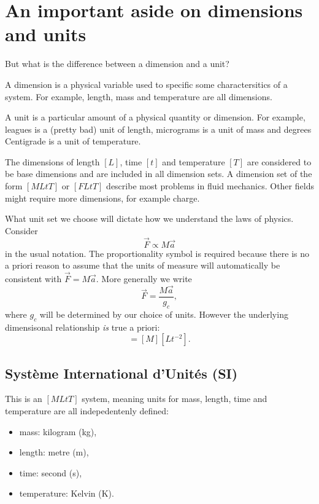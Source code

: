 \section{An important aside on dimensions and units}

But what is the difference between a dimension and a unit?

\begin{definition}
  A dimension is a physical variable used to specific some charactersitics of a system. For example, length, mass and temperature are all dimensions.
\end{definition}

\begin{definition}
  A unit is a particular amount of a physical quantity or dimension. For example, leagues is a (pretty bad) unit of length, micrograms is a unit of mass and degrees Centigrade is a unit of temperature.
\end{definition}

The dimensions of length $[L]$, time $[t]$ and temperature $[T]$ are considered to be base dimensions and are included in all dimension sets. A dimension set of the form $[MLtT]$ or $[FLtT]$ describe most problems in fluid mechanics. Other fields might require more dimensions, for example charge.

What unit set we choose will dictate how we understand the laws of physics. Consider
\begin{equation}
  \vec{F} \propto M \vec{a}
\end{equation}
in the usual notation. The proportionality symbol is required because there is no a priori reason to assume that the units of measure will automatically be consistent with $\vec{F} = M \vec{a}$. More generally we write
\begin{equation}
  \vec{F} = \frac{M \vec{a}}{g_c},
\end{equation}
where $g_c$ will be determined by our choice of units. However the underlying dimensisonal relationship \textit{is} true a priori:
\begin{equation}
  [F] = [M][Lt^{-2}].
\end{equation}

\subsection*{Système International d'Unités (SI)}

This is an $[MLtT]$ system, meaning units for mass, length, time and temperature are all indepedentenly defined:
\begin{itemize}
  \item mass: kilogram (kg),
  \item length: metre (m),
  \item time: second (s),
  \item temperature: Kelvin (K).
\end{itemize}

